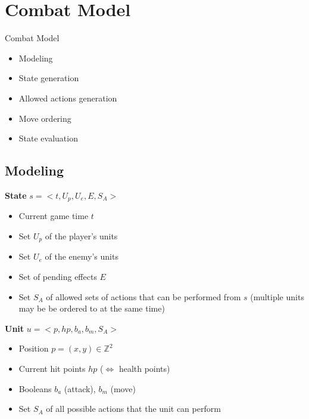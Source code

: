 \documentclass{beamer}
\newenvironment{framesec}{
    \begin{frame}{\secname}
}{\end{frame}}
\newenvironment{framesubsec}{
    \begin{frame}{\subsecname}
}{\end{frame}}
\begin{document}
\section{Combat Model}
\begin{framesec}
    \begin{block}{Combat Model} 
        \begin{itemize}
            \item Modeling
            \item State generation
            \item Allowed actions generation
            \item Move ordering
            \item State evaluation
        \end{itemize}
    \end{block}
\end{framesec}

\subsection{Modeling}
\begin{framesubsec}
    \begin{block}{\textbf{State} $s = <t,U_p,U_e,E,S_A>$}
        \begin{itemize}
        \item Current game time $t$ 
        \item Set $U_p$ of the player's units
        \item Set $U_e$ of the enemy's units
        \item Set of pending effects $E$
        \item Set $S_A$ of allowed sets of actions that can be performed from $s$ (multiple units may be be ordered to at the same time)
    \end{itemize}
    \end{block}

    \begin{block}{\textbf{Unit} $u = <p,hp,b_a,b_m,S_A>$}
        \begin{itemize}
        \item Position $p = (x,y) \in \mathbb{Z}^2$
        \item Current hit points $hp$ ($\Leftrightarrow$ health points)
        \item Booleans $b_a$ (attack), $b_m$ (move)
        \item Set $S_A$ of all possible actions that the unit can perform
        \end{itemize}
    \end{block}
\end{framesubsec}
\end{document}
